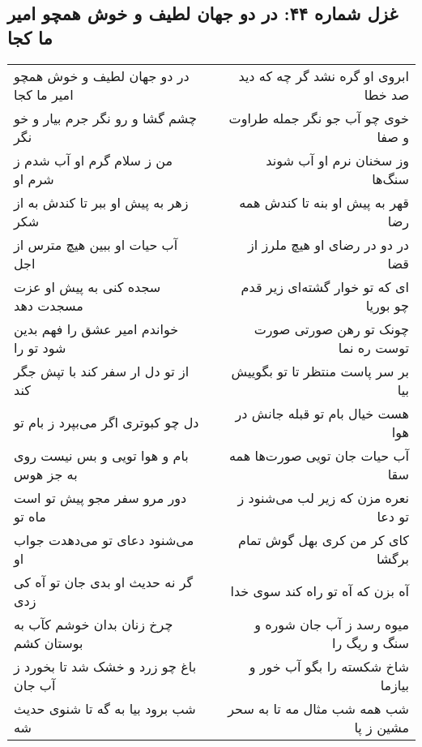 \begin{center}
\section*{غزل شماره ۴۴: در دو جهان لطیف و خوش همچو امیر ما کجا}
\label{sec:0044}
\begin{longtable}{l p{0.5cm} r}
در دو جهان لطیف و خوش همچو امیر ما کجا
&&
ابروی او گره نشد گر چه که دید صد خطا
\\
چشم گشا و رو نگر جرم بیار و خو نگر
&&
خوی چو آب جو نگر جمله طراوت و صفا
\\
من ز سلام گرم او آب شدم ز شرم او
&&
وز سخنان نرم او آب شوند سنگ‌ها
\\
زهر به پیش او ببر تا کندش به از شکر
&&
قهر به پیش او بنه تا کندش همه رضا
\\
آب حیات او ببین هیچ مترس از اجل
&&
در دو در رضای او هیچ ملرز از قضا
\\
سجده کنی به پیش او عزت مسجدت دهد
&&
ای که تو خوار گشته‌ای زیر قدم چو بوریا
\\
خواندم امیر عشق را فهم بدین شود تو را
&&
چونک تو رهن صورتی صورت توست ره نما
\\
از تو دل ار سفر کند با تپش جگر کند
&&
بر سر پاست منتظر تا تو بگوییش بیا
\\
دل چو کبوتری اگر می‌بپرد ز بام تو
&&
هست خیال بام تو قبله جانش در هوا
\\
بام و هوا تویی و بس نیست روی به جز هوس
&&
آب حیات جان تویی صورت‌ها همه سقا
\\
دور مرو سفر مجو پیش تو است ماه تو
&&
نعره مزن که زیر لب می‌شنود ز تو دعا
\\
می‌شنود دعای تو می‌دهدت جواب او
&&
کای کر من کری بهل گوش تمام برگشا
\\
گر نه حدیث او بدی جان تو آه کی زدی
&&
آه بزن که آه تو راه کند سوی خدا
\\
چرخ زنان بدان خوشم کآب به بوستان کشم
&&
میوه رسد ز آب جان شوره و سنگ و ریگ را
\\
باغ چو زرد و خشک شد تا بخورد ز آب جان
&&
شاخ شکسته را بگو آب خور و بیازما
\\
شب برود بیا به گه تا شنوی حدیث شه
&&
شب همه شب مثال مه تا به سحر مشین ز پا
\\
\end{longtable}
\end{center}
